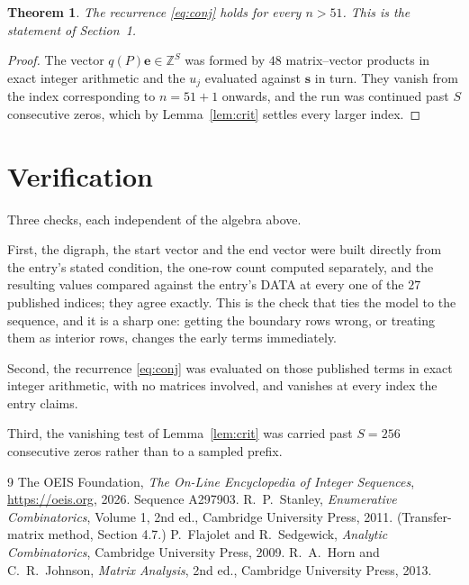 \documentclass[11pt,a4paper]{article}
\theoremstyle{plain}
\newtheorem{theorem}{Theorem}
\theoremstyle{definition}
\begin{document}
\begin{theorem}
The recurrence \eqref{eq:conj} holds for every $n>51$. This is the statement of
Section~1.
\end{theorem}

\begin{proof}
The vector $q(P)\mathbf{e}\in\mathbb{Z}^{S}$ was formed by $48$ matrix--vector
products in exact integer arithmetic and the $u_j$ evaluated against $\mathbf{s}$ in turn.
They vanish from the index corresponding to $n=51+1$ onwards, and the run was continued
past $S$ consecutive zeros, which by Lemma~\ref{lem:crit} settles every larger index.
\end{proof}

\section{Verification}

Three checks, each independent of the algebra above.

First, the digraph, the start vector and the end vector were built directly from the
entry's stated condition, the one-row count computed separately, and the resulting values
compared against the entry's DATA at every one of the $27$ published indices; they
agree exactly. This is the check that ties the model to the sequence, and it is a sharp one:
getting the boundary rows wrong, or treating them as interior rows, changes the early terms
immediately.

Second, the recurrence \eqref{eq:conj} was evaluated on those published terms in exact
integer arithmetic, with no matrices involved, and vanishes at every index the entry claims.

Third, the vanishing test of Lemma~\ref{lem:crit} was carried past $S=256$ consecutive
zeros rather than to a sampled prefix.

\begin{thebibliography}{9}
 The OEIS Foundation, \emph{The On-Line Encyclopedia of Integer
Sequences}, \url{https://oeis.org}, 2026. Sequence A297903.
 R.~P.~Stanley, \emph{Enumerative Combinatorics}, Volume 1, 2nd ed.,
Cambridge University Press, 2011. (Transfer-matrix method, Section 4.7.)
 P.~Flajolet and R.~Sedgewick, \emph{Analytic Combinatorics}, Cambridge
University Press, 2009.
 R.~A.~Horn and C.~R.~Johnson, \emph{Matrix Analysis}, 2nd ed., Cambridge
University Press, 2013.
\end{thebibliography}
\end{document}
